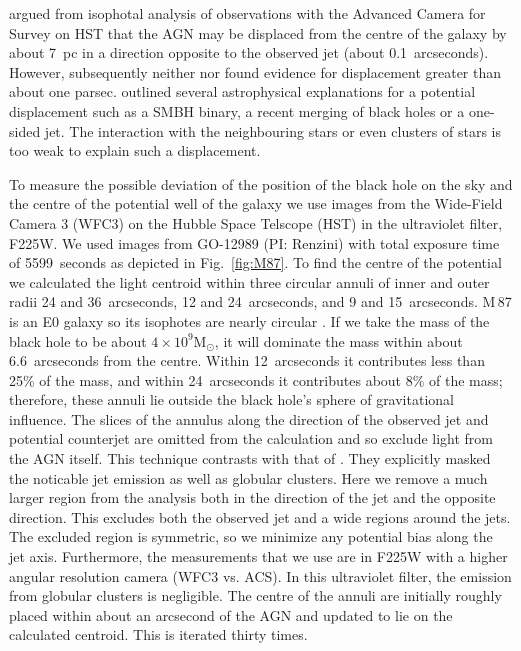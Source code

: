\documentclass[useAMS,usenatbib]{mn2e}
\newcommand{\msun}{\mathrm{M}_\odot}
\begin{document}
\citet{2010ApJ...717L...6B} argued from isophotal analysis of
observations with the Advanced Camera for Survey on HST that the AGN
may be displaced from the centre of the galaxy by about 7~pc in a
direction opposite to the observed jet (about 0.1~arcseconds).
However, subsequently 
neither
\citet{2011ApJ...729..119G} nor
\citet{2013ApJ...770...86W} found evidence for displacement greater
than about one parsec.  \citet{2010ApJ...717L...6B} outlined several
astrophysical explanations for a potential displacement such as a SMBH
binary, a recent merging of black holes or a one-sided jet.  The
interaction with the neighbouring stars or even clusters of stars is
too weak to explain such a displacement.

To measure the possible deviation of the position of the black hole on
the sky and the centre of the potential well of the galaxy we use
images from the Wide-Field Camera 3 (WFC3) on the Hubble Space
Telscope (HST) in the ultraviolet filter, F225W.  We used images from
GO-12989 (PI: Renzini) with total exposure time of 5599~seconds as
depicted in Fig.~\ref{fig:M87}.  To find the centre of the potential
we 
calculated 
the light centroid within three circular annuli of inner
and outer radii 24 and 36~arcseconds, 12 and 24~arcseconds, and 9 and
15~arcseconds.  M\,87 is an E0 galaxy so its isophotes are nearly
circular \citep{2006ApJS..164..334F}.  If we take the mass of the
black hole to be about $4\times 10^9\msun$, it will dominate the mass
within about 6.6~arcseconds from the centre.  Within 12~arcseconds it
contributes less than 25\% of the mass, and within 24~arcseconds it
contributes about 8\% of the mass; therefore, these annuli lie outside
the black hole's sphere of gravitational influence.  The slices of the
annulus along the direction of the observed jet and potential
counterjet are omitted from the calculation and so exclude light from
the AGN itself.  This 
technique 
contrasts with that of
\citet{2010ApJ...717L...6B}.  They explicitly masked the noticable jet
emission as well as globular clusters.  Here we remove a much larger
region from the analysis both in the direction of the jet and the
opposite direction.  This excludes both the observed jet and a wide
regions around the jets.  The excluded region is symmetric, so we
minimize any potential bias along the jet axis.  Furthermore, the
measurements that we use are in F225W with a higher angular resolution
camera (WFC3 vs. ACS).  In this ultraviolet filter, the emission from
globular clusters is negligible.  The centre of the annuli are
initially roughly placed within about an arcsecond of the AGN and
updated to lie on the calculated centroid. This is iterated thirty
times.
\end{document}
